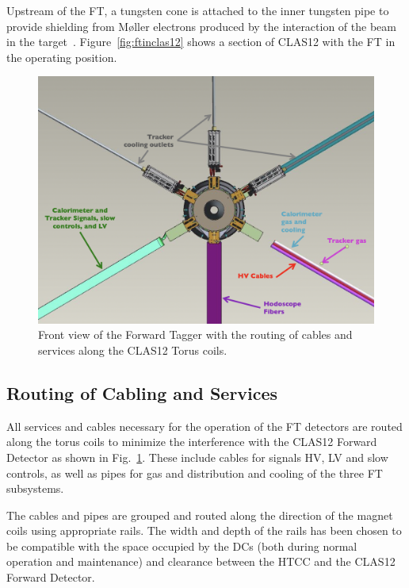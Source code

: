 Upstream of the FT, a tungsten cone is attached to the inner tungsten pipe to provide shielding from M{\o}ller
electrons produced by the interaction of the beam in the target~\cite{beamline}. Figure~\ref{fig:ftinclas12} shows a
section of CLAS12 with the FT in the operating position.

\begin{figure}
\includegraphics[width=1.0\columnwidth]{./fig/ft_cables.png}
\caption{Front view of the Forward Tagger with the routing of cables and services along the CLAS12 Torus coils.}
\label{fig:integra}
\end{figure}

\subsection{Routing of Cabling and Services}

All services and cables necessary for the operation of the FT detectors are routed along the torus coils to minimize
the interference with the CLAS12 Forward Detector as shown in Fig.~\ref{fig:integra}. These include cables for signals HV, LV and slow controls, as well as pipes for gas and distribution and cooling of the three FT subsystems.

The cables and pipes are grouped and routed along the direction of the magnet coils using appropriate rails. The
width and depth of the rails has been chosen to be compatible with the space occupied by the DCs (both during
normal operation and maintenance) and clearance between the HTCC and the CLAS12 Forward Detector.

